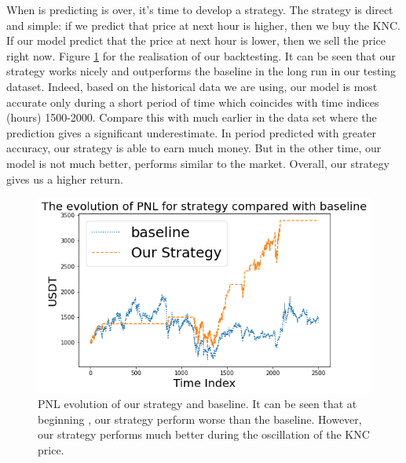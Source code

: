 \documentclass[twoside]{report}
\begin{document}
\begin{spacing}{1}
When is predicting is over, it's time to develop a strategy. The strategy is direct and simple: if we predict that price at next hour is higher, then we buy the KNC. If our model predict that the price at next hour is lower, then we sell the price right now.
Figure \ref{fig:LSTM PNL} for the realisation of our backtesting. It can be seen that our strategy works nicely and outperforms the baseline in the long run in our testing dataset. Indeed, based on the historical data we are using, our model is most accurate only during a short period of time which coincides with time indices (hours) 1500-2000. Compare this with much earlier in the data set where the prediction gives a significant underestimate. In period predicted with greater accuracy, our strategy is able to earn much money. But in the other time, our model is not much better, performs similar to the market. Overall, our strategy gives us a higher return.
\begin{figure}[!ht]
    \centering
    \includegraphics[scale = 0.7]{Images/LSTM PNL.png}
    \caption{PNL evolution of our strategy and baseline. It can be seen that at beginning , our strategy perform worse than the baseline. However, our strategy performs much better during the oscillation of the KNC price.}
    \label{fig:LSTM PNL}
\end{figure}

























\end{spacing}
\end{document}
